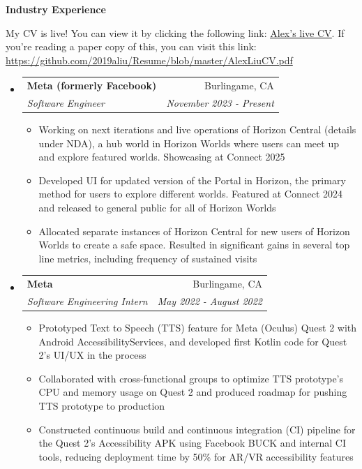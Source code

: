 \documentclass[letterpaper,11pt]{article}
\makeatletter
\newcommand{\resitem}[1]{\item #1 \vspace{-2pt}}
\newcommand{\resheading}[1]{{\large \colorbox{mygrey}{\begin{minipage}{\textwidth}{\textbf{#1 \vphantom{p\^{E}}}}\end{minipage}}}}
\newcommand{\ressubheading}[4]{
\begin{tabular*}{7.0in}{l@{\extracolsep{\fill}}r}
		\textbf{#1} & #2 \\
		\textit{#3} & \textit{#4} \\
\end{tabular*}\vspace{-6pt}}
\makeatother
\begin{document}

\resheading{Industry Experience}

\vspace{1em}
My CV is live! You can view it by clicking the following link: \underline{\href{https://github.com/2019aliu/Resume/blob/master/AlexLiuCV.pdf}{Alex's live CV}}. If you're reading a paper copy of this, you can visit this link: \url{https://github.com/2019aliu/Resume/blob/master/AlexLiuCV.pdf}

\begin{itemize}
\item
    \ressubheading{Meta (formerly Facebook)}{Burlingame, CA}{Software Engineer}{November 2023 - Present}
    \begin{itemize}
        \resitem{Working on next iterations and live operations of Horizon Central (details under NDA), a hub world in Horizon Worlds where users can meet up and explore featured worlds. Showcasing at Connect 2025}
        \resitem{Developed UI for updated version of the Portal in Horizon, the primary method for users to explore different worlds. Featured at Connect 2024 and released to general public for all of Horizon Worlds}
        \resitem{Allocated separate instances of Horizon Central for new users of Horizon Worlds to create a safe space. Resulted in significant gains in several top line metrics, including frequency of sustained visits}
    \end{itemize}
\item
    \ressubheading{Meta}{Burlingame, CA}{Software Engineering Intern}{May 2022 - August 2022}
    \begin{itemize}
        \resitem{Prototyped Text to Speech (TTS) feature for Meta (Oculus) Quest 2 with Android AccessibilityServices, and developed first Kotlin code for Quest 2's UI/UX in the process}
        \resitem{Collaborated with cross-functional groups to optimize TTS prototype's CPU and memory usage on Quest 2 and produced roadmap for pushing TTS prototype to production}
        \resitem{Constructed continuous build and continuous integration (CI) pipeline for the Quest 2's Accessibility APK using Facebook BUCK and internal CI tools, reducing deployment time by 50\% for AR/VR accessibility features}

\end{itemize}
\end{itemize}
\end{document}
